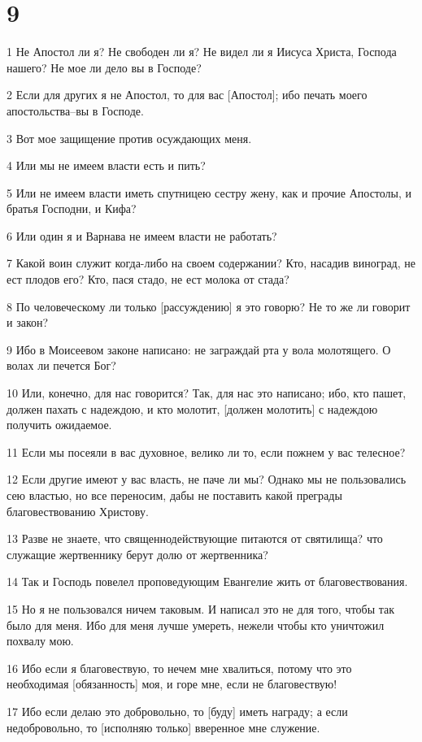 \chapter{9}

\par 1 Не Апостол ли я? Не свободен ли я? Не видел ли я Иисуса Христа, Господа нашего? Не мое ли дело вы в Господе?
\par 2 Если для других я не Апостол, то для вас [Апостол]; ибо печать моего апостольства--вы в Господе.
\par 3 Вот мое защищение против осуждающих меня.
\par 4 Или мы не имеем власти есть и пить?
\par 5 Или не имеем власти иметь спутницею сестру жену, как и прочие Апостолы, и братья Господни, и Кифа?
\par 6 Или один я и Варнава не имеем власти не работать?
\par 7 Какой воин служит когда-либо на своем содержании? Кто, насадив виноград, не ест плодов его? Кто, пася стадо, не ест молока от стада?
\par 8 По человеческому ли только [рассуждению] я это говорю? Не то же ли говорит и закон?
\par 9 Ибо в Моисеевом законе написано: не заграждай рта у вола молотящего. О волах ли печется Бог?
\par 10 Или, конечно, для нас говорится? Так, для нас это написано; ибо, кто пашет, должен пахать с надеждою, и кто молотит, [должен молотить] с надеждою получить ожидаемое.
\par 11 Если мы посеяли в вас духовное, велико ли то, если пожнем у вас телесное?
\par 12 Если другие имеют у вас власть, не паче ли мы? Однако мы не пользовались сею властью, но все переносим, дабы не поставить какой преграды благовествованию Христову.
\par 13 Разве не знаете, что священнодействующие питаются от святилища? что служащие жертвеннику берут долю от жертвенника?
\par 14 Так и Господь повелел проповедующим Евангелие жить от благовествования.
\par 15 Но я не пользовался ничем таковым. И написал это не для того, чтобы так было для меня. Ибо для меня лучше умереть, нежели чтобы кто уничтожил похвалу мою.
\par 16 Ибо если я благовествую, то нечем мне хвалиться, потому что это необходимая [обязанность] моя, и горе мне, если не благовествую!
\par 17 Ибо если делаю это добровольно, то [буду] иметь награду; а если недобровольно, то [исполняю только] вверенное мне служение.
